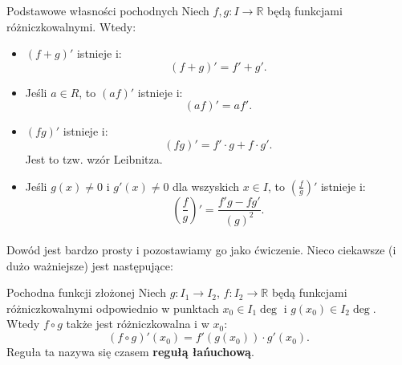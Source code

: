 \documentclass{article}
\numberwithin{defi}{section}
\numberwithin{defi}{section}
\newcommand{\R}{\mathbb{R}}
\begin{document}
    \begin{obs}{Podstawowe własności pochodnych}
        Niech $f, g: I \to \R$ będą funkcjami różniczkowalnymi. Wtedy:\begin{itemize}
            \item $(f + g)'$ istnieje i: \begin{equation}
                (f + g)' = f' + g'.
            \end{equation}
            \item Jeśli $a \in R$, to $(a f)'$ istnieje i: \begin{equation}
                (a f)' = a f'.
            \end{equation}
            \item $(fg)'$ istnieje i: \begin{equation}
                (fg)' = f' \cdot g + f \cdot g'.
            \end{equation} Jest to tzw. wzór Leibnitza.
            \item Jeśli $g(x) \neq 0$ i $g'(x) \neq 0$ dla wszyskich $x \in I$, to $(\frac{f}{g})'$ istnieje i: \begin{equation}
                (\frac{f}{g})' = \frac{f' g - f g'}{(g)^2}.
            \end{equation}
        \end{itemize}
    \end{obs}


    \paragraph{} Dowód jest bardzo prosty i pozostawiamy go jako ćwiczenie.
    Nieco ciekawsze (i dużo ważniejsze) jest następujące: 
    \begin{twier}{Pochodna funkcji złożonej}
        Niech $g: I_1 \to I_2$, $f: I_2 \to \R$ będą funkcjami różniczkowalnymi odpowiednio w punktach $x_0 \in I_1 \deg$ i $g(x_0) \in I_2 \deg$. Wtedy $f \circ g$ także jest różniczkowalna i w $x_0$: \begin{equation}
            (f \circ g)' (x_0) = f'(g(x_0)) \cdot g'(x_0).
        \end{equation} Reguła ta nazywa się czasem \textbf{regułą łańuchową}.
    \end{twier}
\end{document}

